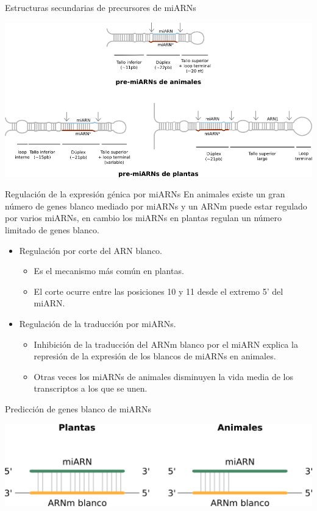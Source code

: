 \documentclass{beamer}
\begin{document}
\begin{frame}{Estructuras secundarias de precursores de miARNs}
	\begin{center}
		\includegraphics[width=1\textwidth]{img/ss_precursores.png}
	\end{center}
\end{frame}

\begin{frame}{Regulación de la expresión génica por miARNs}
En animales existe un gran número de genes blanco mediado por miARNs y un ARNm puede estar regulado por varios miARNs, en cambio los miARNs en plantas regulan un número limitado de genes blanco.
    \begin{itemize}
        \item<2-> Regulación por corte del ARN blanco.
        \begin{itemize}
            \item Es el mecanismo más común en plantas.
            \item El corte ocurre entre las posiciones 10 y 11 desde el extremo 5’ del miARN.
        \end{itemize}
        \item<3-> Regulación de la traducción por miARNs.
        \begin{itemize}
            \item Inhibición de la traducción del ARNm blanco por el miARN explica la represión de la expresión de los blancos de miARNs en animales.
            \item Otras veces los miARNs de animales disminuyen la vida media de los transcriptos a los que se unen.
        \end{itemize}

    \end{itemize}
\end{frame}

\begin{frame}{Predicción de genes blanco de miARNs}
	\begin{center}
		\includegraphics[width=1\textwidth]{img/interaccion_miRNA_target.png}
	\end{center}
\end{frame}
\end{document}
